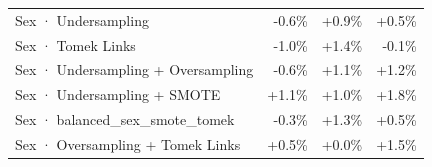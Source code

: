 \begin{table}[htbp]
\begin{tabular}{lrrr}
Sex · Undersampling & \textcolor{BrickRed}{-0.6\%} & \textcolor{OliveGreen}{+0.9\%} & \textcolor{OliveGreen}{+0.5\%} \\
Sex · Tomek Links & \textcolor{BrickRed}{-1.0\%} & \textcolor{OliveGreen}{+1.4\%} & \textcolor{BrickRed}{-0.1\%} \\
Sex · Undersampling + Oversampling & \textcolor{BrickRed}{-0.6\%} & \textcolor{OliveGreen}{+1.1\%} & \textcolor{OliveGreen}{+1.2\%} \\
Sex · Undersampling + SMOTE & \textcolor{OliveGreen}{+1.1\%} & \textcolor{OliveGreen}{+1.0\%} & \textcolor{OliveGreen}{+1.8\%} \\
Sex · balanced_sex_smote_tomek & \textcolor{BrickRed}{-0.3\%} & \textcolor{OliveGreen}{+1.3\%} & \textcolor{OliveGreen}{+0.5\%} \\
Sex · Oversampling + Tomek Links & \textcolor{OliveGreen}{+0.5\%} & \textcolor{OliveGreen}{+0.0\%} & \textcolor{OliveGreen}{+1.5\%} \\
\bottomrule
\end{tabular}
\end{table}